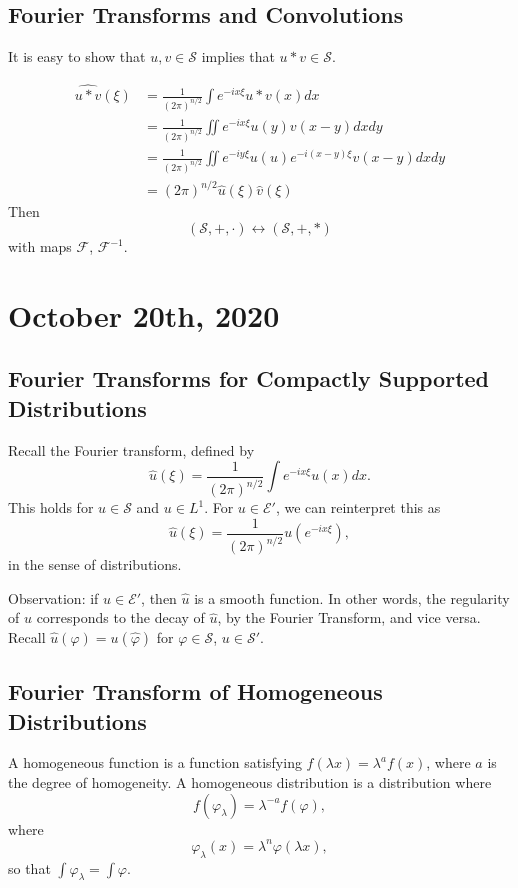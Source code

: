 \documentclass[12pt]{scrartcl}
\renewcommand{\hat}{\widehat}
\let \phi \varphi
\begin{document}
\subsection{Fourier Transforms and Convolutions}
It is easy to show that $u, v \in \mathcal S$ implies that $u * v \in \mathcal S$.

\begin{align*}
\hat{u*v}(\xi) &=\frac{1}{(2\pi)^{n/2}} \int e^{-ix\xi} u*v(x)dx \\
&= \frac{1}{(2\pi)^{n/2}}\iint e^{-ix\xi} u(y)v(x-y)dxdy \\
&= \frac{1}{(2\pi)^{n/2}} \iint e^{-iy\xi}u(u)e^{-i(x-y)\xi}v(x-y) dxdy \\
&= (2\pi)^{n/2}\hat{u}(\xi) \hat{v}(\xi)
\end{align*}
Then
$$(\mathcal S, +, \cdot) \leftrightarrow (\mathcal S, +, *)$$
with maps $\mathcal F$, $\mathcal F^{-1}$.

\pagebreak
\section{October 20th, 2020}
\subsection{Fourier Transforms for Compactly Supported Distributions}
Recall the Fourier transform, defined by 
$$\hat{u}(\xi) = \frac{1}{(2\pi)^{n/2}}\int e^{-ix\xi}u(x)dx.$$
This holds for $u \in \mathcal S$ and $u \in L^1$.  For $u \in \mathcal E'$, we can reinterpret this as 
$$\hat{u}(\xi) = \frac{1}{(2\pi)^{n/2}} u(e^{-ix\xi}),$$
in the sense of distributions.

Observation: if $u \in \mathcal E'$, then $\hat{u}$ is a smooth function.  In other words, the regularity of $u$ corresponds to the decay of $\hat{u}$, by the Fourier Transform, and vice versa.  Recall $\hat{u}(\phi) = u(\hat{\phi})$ for $\phi \in \mathcal S$, $u \in \mathcal S'$.

\subsection{Fourier Transform of Homogeneous Distributions}
A homogeneous function is a function satisfying $f(\lambda x) = \lambda^a f(x)$, where $a$ is the degree of homogeneity.  A homogeneous distribution is a distribution where
$$f(\phi_\lambda) = \lambda^{-a} f(\phi),$$
where $$\phi_\lambda(x) = \lambda^{n}\phi(\lambda x),$$
so that $\int \phi_\lambda = \int \phi$.
\end{document}
